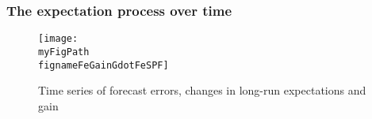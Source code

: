 \documentclass[10pt]{beamer}
\def \myFigPath {../../../figures/}
\def\fignameFeSPF{fe_SPF_command_anchoring_in_data_19_Sep_2020_11_45_59}
\def\fignameGainSPF{gain_SPF_command_anchoring_in_data_11_Oct_2020_11_08_39}
\def\fignameFeGainGdotFeSPF{fe_gain_gdot_fe_SPF_command_anchoring_in_data_18_Oct_2020_13_11_56}
\begin{document}
\begin{frame}[plain]  %
	\frametitle{The expectation process over time}

\begin{figure}[h!]
\texttt{[image: \\myFigPath \\fignameFeGainGdotFeSPF]}
\caption{Time series of forecast errors, changes in long-run expectations and gain}
\label{fe_in_data}
\end{figure}

%
%


\end{frame}
\end{document}
